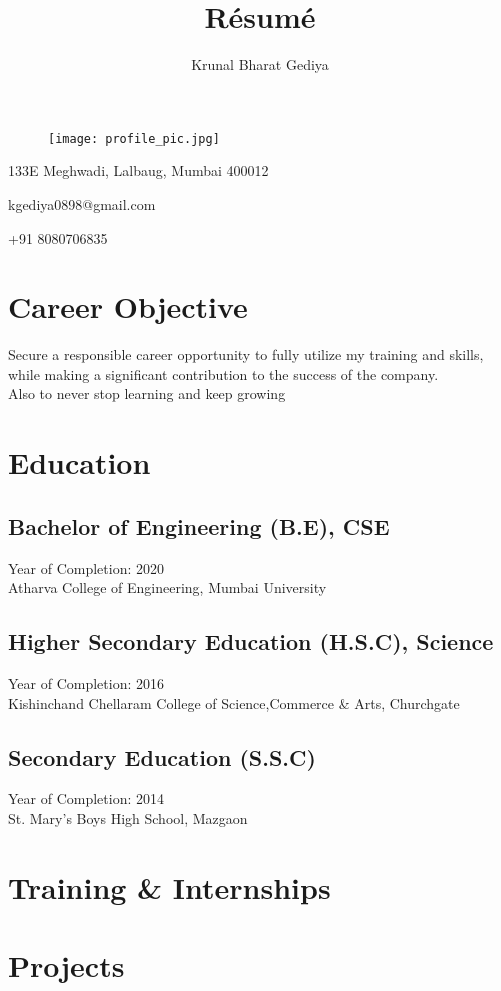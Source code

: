 \documentclass[11pt]{article}
\begin{document}
\title{R\'esum\'e}

\author{Krunal Bharat Gediya}

\maketitle
\begin{figure}[H]
    \centering
    \texttt{[image: profile\_pic.jpg]}
\end{figure}
\begin{center}
    133E Meghwadi, Lalbaug, Mumbai 400012

    kgediya0898@gmail.com
    
    +91 8080706835 
\end{center}

\section{Career Objective}
Secure a responsible career opportunity to fully utilize my training and skills, while making a significant contribution to the success of the company.\\
Also to never stop learning and keep growing
\section{Education}
\subsection{Bachelor of Engineering (B.E), CSE}
Year of Completion: 2020\\
Atharva College of Engineering, Mumbai University
\subsection{Higher Secondary Education (H.S.C), Science}
Year of Completion: 2016\\
Kishinchand Chellaram College of Science,Commerce \& Arts, Churchgate
\subsection{Secondary Education (S.S.C)}
Year of Completion: 2014\\
St. Mary's Boys High School, Mazgaon
\section{Training \& Internships}
\section{Projects}
\end{document}

